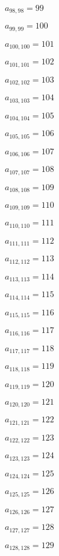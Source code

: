 \documentclass[a4paper,12pt]{article}
\begin{document}
$a _{ 98, 98 } = 99$

$a _{ 99, 99 } = 100$

$a _{ 100, 100 } = 101$

$a _{ 101, 101 } = 102$

$a _{ 102, 102 } = 103$

$a _{ 103, 103 } = 104$

$a _{ 104, 104 } = 105$

$a _{ 105, 105 } = 106$

$a _{ 106, 106 } = 107$

$a _{ 107, 107 } = 108$

$a _{ 108, 108 } = 109$

$a _{ 109, 109 } = 110$

$a _{ 110, 110 } = 111$

$a _{ 111, 111 } = 112$

$a _{ 112, 112 } = 113$

$a _{ 113, 113 } = 114$

$a _{ 114, 114 } = 115$

$a _{ 115, 115 } = 116$

$a _{ 116, 116 } = 117$

$a _{ 117, 117 } = 118$

$a _{ 118, 118 } = 119$

$a _{ 119, 119 } = 120$

$a _{ 120, 120 } = 121$

$a _{ 121, 121 } = 122$

$a _{ 122, 122 } = 123$

$a _{ 123, 123 } = 124$

$a _{ 124, 124 } = 125$

$a _{ 125, 125 } = 126$

$a _{ 126, 126 } = 127$

$a _{ 127, 127 } = 128$

$a _{ 128, 128 } = 129$
\end{document}
